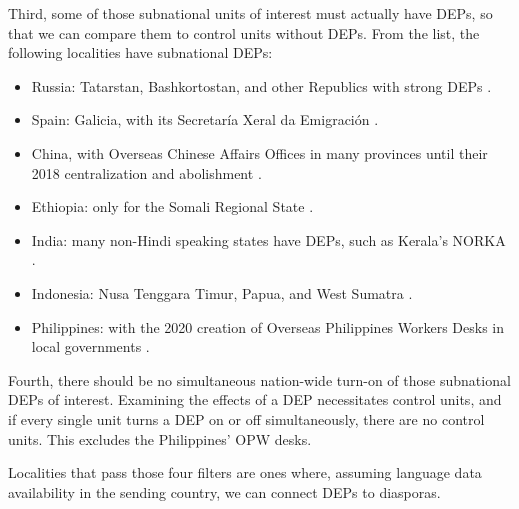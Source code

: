 \documentclass[12pt]{article}
\begin{document}
    Third, some of those subnational units of interest must actually have DEPs, so that we can compare them to control units without DEPs. From the list, the following localities have subnational DEPs:
    \begin{itemize}
        \item Russia: Tatarstan, Bashkortostan, and other Republics with strong DEPs \citep{albina_external_2010}.
        \item Spain: Galicia, with its Secretaría Xeral da Emigración \citep{noauthor_galiciaaberta_nodate}.
        \item China, with Overseas Chinese Affairs Offices in many provinces until their 2018 centralization and abolishment \citep{guotu_chinas_2013}.
        \item Ethiopia: only for the Somali Regional State \citep{berhanu_ethiopian_2019}.
        \item India: many non-Hindi speaking states have DEPs, such as Kerala's NORKA \citep{rajan_assessment_2012}.
        \item Indonesia: Nusa Tenggara Timur, Papua, and West Sumatra \citep{noauthor_dinas_nodate, noauthor_badan_nodate, noauthor_portal_nodate}.
        \item Philippines: with the 2020 creation of Overseas Philippines Workers Desks in local governments \citep{noauthor_dilg_nodate}.
    \end{itemize}

     Fourth, there should be no simultaneous nation-wide turn-on of those subnational DEPs of interest. Examining the effects of a DEP necessitates control units, and if every single unit turns a DEP on or off simultaneously, there are no control units. This excludes the Philippines' OPW desks. 
     
     Localities that pass those four filters are ones where, assuming language data availability in the sending country, we can connect DEPs to diasporas. 
    
\end{document}
